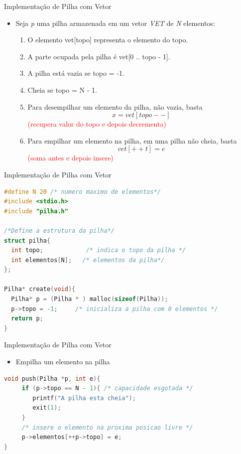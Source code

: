 \begin{frame}{Implementação de Pilha com Vetor}  
	\begin{itemize}
		\item Seja \textit{p} uma pilha armazenada em um vetor \textit{VET} de \textit{N} elementos:		
			\begin{enumerate}
				\item O elemento vet[topo] representa o elemento do topo.
				\item A parte ocupada pela pilha é vet[0 .. topo - 1].
				\item A pilha está vazia se topo = -1.
				\item Cheia se topo = N - 1.
				\item Para desempilhar um elemento da pilha, não vazia,
				 basta $$x = vet[topo--]$$ \textcolor{red}{(recupera valor do topo e depois decrementa)} 
				\item Para empilhar um elemento na pilha, em uma pilha não cheia, 
				basta $$vet[++t] = e$$   \textcolor{red}{(soma antes e depois insere)}
			\end{enumerate}
	\end{itemize}
\end{frame}

\begin{frame}[fragile]{Implementação de Pilha com Vetor}
\begin{lstlisting}[language=C]
#define N 20 /* numero maximo de elementos*/
#include <stdio.h>
#include "pilha.h"

/*Define a estrutura da pilha*/
struct pilha{
  int topo;            /* indica o topo da pilha */
  int elementos[N];   /* elementos da pilha*/
};

Pilha* create(void){
  Pilha* p = (Pilha * ) malloc(sizeof(Pilha));
  p->topo = -1;     /* inicializa a pilha com 0 elementos */
  return p;
}	
	\end{lstlisting}  
\end{frame}

\begin{frame}[fragile,c]{Implementação de Pilha com Vetor}
\begin{itemize}
	\item Empilha um elemento na pilha
\end{itemize}
\begin{lstlisting}[language=C]
void push(Pilha *p, int e){
     if (p->topo == N - 1){ /* capacidade esgotada */
        printf("A pilha esta cheia");
        exit(1);
     }
     /* insere o elemento na proxima posicao livre */
     p->elementos[++p->topo] = e;
}	
\end{lstlisting}  
\end{frame}

